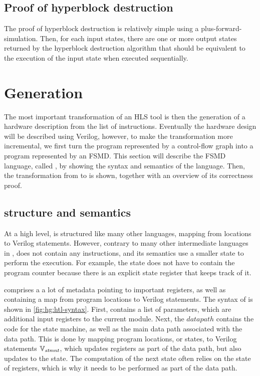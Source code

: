 \subsection{Proof of hyperblock destruction}

The proof of hyperblock destruction is relatively simple using a
\gls{plus-forward-simulation}.  Then, for each input states, there are one or
more output states returned by the hyperblock destruction algorithm that should
be equivalent to the execution of the input state when executed sequentially.

\section{\htl{} Generation}%
\label{sec:hg:htl-generation}

The most important transformation of an HLS tool is then the generation of a
hardware description from the list of instructions.  Eventually the hardware
design will be described using Verilog, however, to make the transformation more
incremental, we first turn the program represented by a control-flow graph into
a program represented by an \gls{FSMD}.  This section will describe the
\gls{FSMD} language, called \htl{}, by showing the syntax and semantics of the
language.  Then, the transformation from \rtlsubpar{} to \htl{} is shown, together
with an overview of its correctness proof.

\subsection{\htl{} structure and semantics}%
\label{sec:hg:htl-structure-and-semantics}

At a high level, \htl{} is structured like many other \compcert{} languages,
mapping from locations to Verilog statements.  However, contrary to many other
intermediate languages in \compcert{}, \htl{} does not contain any instructions,
and its semantics use a smaller state to perform the execution.  For example,
the state does not have to contain the program counter because there is an
explicit state register that keeps track of it.

\htl{} comprises a a lot of metadata pointing to important registers, as well as
containing a map from program locations to Verilog statements.  The syntax of
\htl{} is shown in \cref{fig:hg:htl-syntax}.  First, \htl{} contains a list of
parameters, which are additional input registers to the current module.  Next,
the $\mathit{datapath}$ contains the code for the state machine, as well as the
main data path associated with the data path.  This is done by mapping program
locations, or states, to Verilog statements $\mathbb{V}_\mathit{stmnt}$, which updates
registers as part of the data path, but also updates to the state.  The
computation of the next state often relies on the state of registers, which is
why it needs to be performed as part of the data path.


